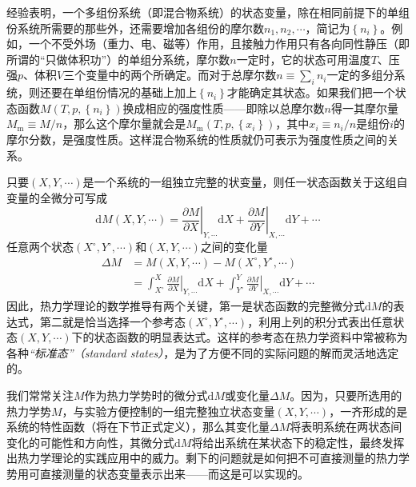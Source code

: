 \documentclass[main.tex]{subfiles}
\begin{document}
经验表明，一个多组份系统（即混合物系统）的状态变量，除在相同前提下的单组份系统所需要的那些外，还需要增加各组份的摩尔数$n_1,n_2,\cdots$，简记为$\left\{n_i\right\}$。例如，一个不受外场（重力、电、磁等）作用，且接触力作用只有各向同性静压（即所谓的“只做体积功”）的单组分系统，摩尔数$n$一定时，它的状态可用温度$T$、压强$p$、体积$V$三个变量中的两个所确定。而对于总摩尔数$n\equiv\sum_in_i$一定的多组分系统，则还要在单组份情况的基础上加上$\left\{n_i\right\}$才能确定其状态。如果我们把一个状态函数$M\left(T,p,\left\{n_i\right\}\right)$换成相应的强度性质——即除以总摩尔数$n$得一其摩尔量$M_\text{m}\equiv M/n$，那么这个摩尔量就会是$M_\text{m}\left(T,p,\left\{x_i\right\}\right)$，其中$x_i\equiv n_i/n$是组份$i$的摩尔分数，是强度性质。这样混合物系统的性质就仍可表示为强度性质之间的关系。

只要$\left(X,Y,\cdots\right)$是一个系统的一组独立完整的状变量，则任一状态函数关于这组自变量的全微分可写成
\[\mathrm{d}M\left(X,Y,\cdots\right)=\left.\frac{\partial M}{\partial X}\right|_{Y,\cdots}\mathrm{d}X+\left.\frac{\partial M}{\partial Y}\right|_{X,\cdots}\mathrm{d}Y+\cdots\]
任意两个状态$\left(X^\circ,Y^\circ,\cdots\right)$和$\left(X,Y,\cdots\right)$之间的变化量
\begin{equation}\label{eq:I.1_integral_of_function}
  \begin{aligned}
    \Delta M & =M\left(X,Y,\cdots\right)-M\left(X^\circ,Y^\circ,\cdots\right)                                                                                                                \\
             & =\int_{X^\circ}^{X}\left.\frac{\partial M}{\partial X}\right|_{Y,\cdots}\mathrm{d}X+\int_{Y^\circ}^{Y}\left.\frac{\partial M}{\partial Y}\right|_{X,\cdots}\mathrm{d}Y+\cdots
  \end{aligned}
\end{equation}
因此，热力学理论的数学推导有两个关键，第一是状态函数的完整微分式$\mathrm{d}M$的表达式，第二就是恰当选择一个参考态$\left(X^\circ,Y^\circ,\cdots\right)$，利用上列的积分式表出任意状态$\left(X,Y,\cdots\right)$下的状态函数的明显表达式。这样的参考态在热力学资料中常被称为各种\emph{“标准态”（standard states）}，是为了方便不同的实际问题的解而灵活地选定的。

我们常常关注$M$作为热力学势时的微分式$\mathrm{d}M$或变化量$\Delta M$。因为，只要所选用的热力学势$M$，与实验方便控制的一组完整独立状态变量$\left(X,Y,\cdots\right)$，一齐形成的是系统的特性函数（将在下节正式定义），那么其变化量$\Delta M$将表明系统在两状态间变化的可能性和方向性，其微分式$\mathrm{d}M$将给出系统在某状态下的稳定性，最终发挥出热力学理论的实践应用中的威力。剩下的问题就是如何把不可直接测量的热力学势用可直接测量的状态变量表示出来——而这是可以实现的。
\end{document}

